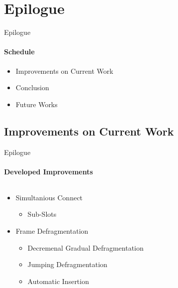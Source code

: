 \section{Epilogue}
     \begin{frame}[t]{Epilogue}\framesubtitle{Schedule}
        \begin{itemize}
            \item Improvements on Current Work
            \item Conclusion
            \item Future Works
        \end{itemize}
    \end{frame}

    \subsection{Improvements on Current Work}
        \begin{frame}[t]{Epilogue}\framesubtitle{Developed Improvements}
            \begin{columns}[T]
                \begin{column}{0.48\textwidth}
                    \begin{itemize}
                        \item Simultanious Connect
                            \begin{itemize}
                                \item Sub-Slots
                            \end{itemize}
                        \item Frame Defragmentation
                            \begin{itemize}
                                \item Decremenal Gradual Defragmentation
                                \item Jumping Defragmentation
                                \item Automatic Insertion
                            \end{itemize}
                    \end{itemize}
                \end{column}
                \begin{column}{.48\textwidth}
                    \begin{figure}
                    \end{figure}
                \end{column}
            \end{columns}
        \end{frame}
